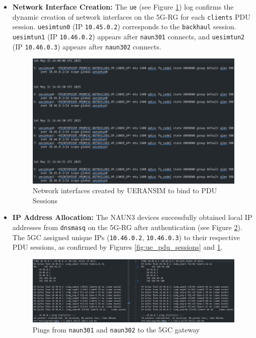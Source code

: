 \begin{itemize}
    \item \textbf{Network Interface Creation:} The \texttt{ue} (see Figure \ref{fig:ue_pdu_sessions_nics}) log confirms the dynamic creation of network interfaces on the \ac{5G-RG} for each \texttt{clients} \ac{PDU} session. \texttt{uesimtun0} (\ac{IP} \texttt{10.45.0.2}) corresponds to the \texttt{backhaul} session. \texttt{uesimtun1} (\ac{IP} \texttt{10.46.0.2}) appears after \texttt{naun301} connects, and \texttt{uesimtun2} (\ac{IP} \texttt{10.46.0.3}) appears after \texttt{naun302} connects.

    \begin{figure}
        \centering
        \includegraphics[width=1\linewidth]{figs/ue_pdu_sessions_nics.png}
        \caption{Network interfaces created by UERANSIM to bind to \acs{PDU} Sessions}
        \label{fig:ue_pdu_sessions_nics}
    \end{figure}

    \item \textbf{\ac{IP} Address Allocation:} The \ac{NAUN3} devices successfully obtained local \ac{IP} addresses from \texttt{dnsmasq} on the \ac{5G-RG} after authentication (see Figure \ref{fig:ping_gw}). The \ac{5GC} assigned unique \acp{IP} (\texttt{10.46.0.2}, \texttt{10.46.0.3}) to their respective \ac{PDU} sessions, as confirmed by Figures \ref{fig:ue_pdu_sessions} and \ref{fig:ue_pdu_sessions_nics}.

    \begin{figure}
        \centering
        \includegraphics[width=1\linewidth]{figs/ping_gw.png}
        \caption{Pings from \texttt{naun301} and \texttt{naun302} to the \acs{5GC} gateway}
        \label{fig:ping_gw}
    \end{figure}


\end{itemize}

